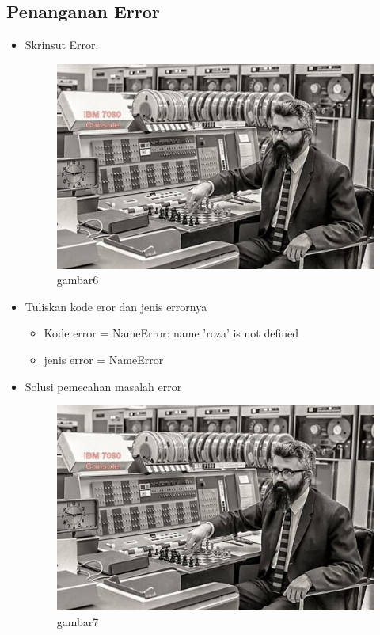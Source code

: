 \subsection{Penanganan Error}
\begin{itemize}
\item Skrinsut Error.
\begin{figure}[ht]
\centering
\includegraphics[scale=0.7]{figures/contoh.jpg}
\caption{gambar6}
\label{roza6}
\end{figure}
\end{itemize}
\begin{itemize}
\item Tuliskan kode eror dan jenis errornya
\begin{itemize}
\item Kode error = NameError: name 'roza' is not defined
\item jenis error = NameError
\end{itemize}
\end{itemize}
\begin{itemize}
\item  Solusi pemecahan masalah error
\begin{figure}[ht]
\centering
\includegraphics[scale=0.7]{figures/contoh.jpg}
\caption{gambar7}
\label{roza7}
\end{figure}
\end{itemize}



